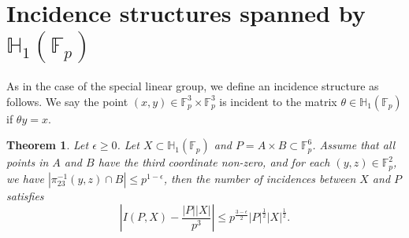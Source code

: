 \documentclass[11pt]{article}
\newtheorem{theorem}{Theorem}[section]
\def\Fbb{\mathbb{F}}
\def\l({\left(}
\def\r){\right)}
\def\lv{\left\vert}
\def\rv{\right\vert}
\def\lo{\left\{}
\def\ro{\right\}}
\begin{document}





\section{Incidence structures spanned by \texorpdfstring{$\mathbb{H}_1(\mathbb{F}_p)$}{H1(Fp)}}
As in the case of the special linear group, we define an incidence structure as follows. We say the point $(x, y)\in \mathbb{F}_p^3\times \mathbb{F}_p^3$ is incident to the matrix $\theta\in \mathbb{H}_1(\Fbb_p)$ if $\theta y=x$. 

\begin{theorem}\label{H-inci}Let $\epsilon\ge 0$.
    Let $X\subset \mathbb{H}_1(\Fbb_p)$ and $P=A\times B\subset \mathbb{F}_p^6$. Assume that all points in $A$ and $B$ have the third coordinate non-zero, and for each $(y, z)\in \mathbb{F}_p^2$, we have $|\pi_{23}^{-1}(y, z)\cap B|\le p^{1-\epsilon}$, then the number of incidences between $X$ and $P$ satisfies
    \[\left\vert I(P, X)- \frac{|P||X|}{p^3} \right\vert\le p^{\frac{3-\epsilon}{2}}|P|^{\frac{1}{2}}|X|^{\frac{1}{2}}.\]
\end{theorem}
\end{document}

